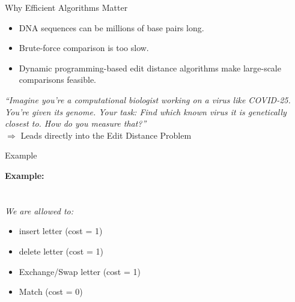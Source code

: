 \begin{frame}{Why Efficient Algorithms Matter}
\begin{itemize}
    \item DNA sequences can be millions of base pairs long.
    \item Brute-force comparison is too slow.
    \item Dynamic programming-based edit distance algorithms make large-scale comparisons feasible.
\end{itemize}

\vspace{0.4cm}

\textit{“Imagine you’re a computational biologist working on a virus like COVID-25. You're given its genome. Your task: Find which known virus it is genetically closest to. How do you measure that?”} \\
\vspace{0.2cm}
\hfill $\Rightarrow$ Leads directly into the Edit Distance Problem
\end{frame}
\begin{frame}{Example}


    \small
    \textbf{Example:}\\
    \\
    \\
    \textit{We are allowed to:}\\
    \begin{itemize}
        \item insert letter (cost = 1)
        \item delete letter (cost = 1)
        \item Exchange/Swap letter (cost = 1)
        \item Match (cost = 0)
    \end{itemize}
    \\
    \vspace{0.5cm}
  \textcolor{gray}{\\
   }


\end{frame}

